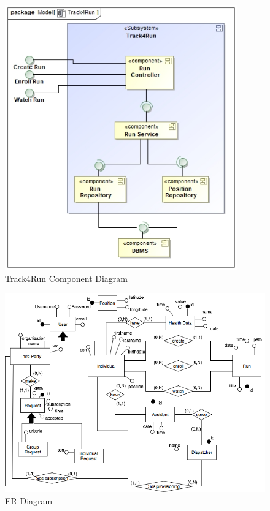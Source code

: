 \documentclass[a4paper]{article}
\begin{document}
\begin{figure}[!htpb]
    \centering
    \includegraphics[width=100mm,keepaspectratio]{DD/images/UML/component_Track4Run.jpg}
    \caption{Track4Run Component Diagram}
    \label{fig:component_track4run}
\end{figure}

\begin{figure}[!htpb]
    \centering
    \includegraphics[width=\textwidth,keepaspectratio]{DD/images/er_diagram.png}
    \caption{ER Diagram}
    \label{fig:ER_trackme}
\end{figure}
\end{document}
